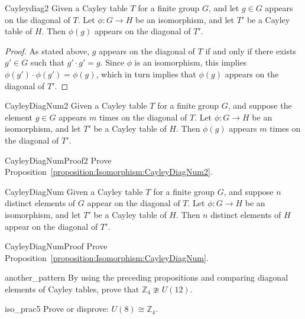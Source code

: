 \begin{prop}{Cayleydiag2}
Given a Cayley table $T$ for a finite group $G$, and let $g \in G$  appears on the diagonal of $T$. Let $\phi:G \rightarrow H$ be an isomorphism, and let $T'$ be a Cayley table of $H$. Then $\phi(g)$ appears on the diagonal of $T'$.
\end{prop}

\begin{proof}
As stated above, $g$ appears on the diagonal of $T$ if and only if there exists $g' \in G$ such that $g' \cdot g' = g$.  Since $\phi$ is an isomorphism, this implies $\phi(g') \cdot \phi(g') = \phi(g)$, which in turn implies that $\phi(g)$ appears on the diagonal of $T'$.
\end{proof}

\begin{prop}{CayleyDiagNum2}
Given a Cayley table $T$ for a finite group $G$, and suppose the element $g \in G$ appears $m$ times on the diagonal of $T$.  Let $\phi:G \rightarrow H$ be an isomorphism, and let $T'$ be a Cayley table of $H$. Then $\phi(g)$ appears $m$ times  on the diagonal of $T'$.
\end{prop}

\begin{exercise}{CayleyDiagNumProof2}
Prove Proposition~\ref{proposition:Isomorphism:CayleyDiagNum2}.
\end{exercise}

\begin{prop}{CayleyDiagNum}
Given a Cayley table $T$ for a finite group $G$, and suppose $n$ distinct elements of $G$ appear on the diagonal of $T$.  Let $\phi:G \rightarrow H$ be an isomorphism, and let $T'$ be a Cayley table of $H$. Then $n$ distinct elements of $H$ appear on the diagonal of $T'$.
\end{prop}

\begin{exercise}{CayleyDiagNumProof}
Prove Proposition~\ref{proposition:Isomorphism:CayleyDiagNum}.
\end{exercise}


\begin{exercise}{another_pattern}
By using the preceding propositions and comparing diagonal elements of Cayley tables, prove  that ${\mathbb Z}_4 \ncong U(12)$.
\end{exercise} 

\begin{exercise}{iso_prac5}
Prove or disprove: $U(8) \cong {\mathbb Z}_4$.
\end{exercise}
  
